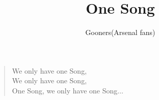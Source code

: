 \documentclass[a4paper,12pt]{article}
\title{One Song}
\author{Gooners(Arsenal fans)}
\date{}
\begin{document}
	
	\maketitle
	
	\begin{verse}
		
		We only have one Song, \\
		We only have one Song, \\
		One Song, we only have one Song$\ldots$
		
	\end{verse}
	
\end{document}
